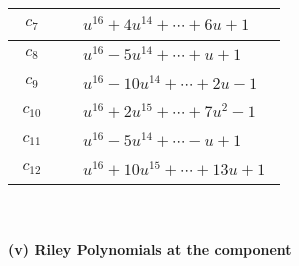 \documentclass[1p]{elsarticle_modified}
\theoremstyle{definition}
\begin{document}
\begin{tabular}{m{50pt}|m{274pt}}
\hline $$\begin{aligned}c_{7}\end{aligned}$$&$\begin{aligned}
&u^{16}+4 u^{14}+\cdots+6 u+1
\end{aligned}$\\
\hline $$\begin{aligned}c_{8}\end{aligned}$$&$\begin{aligned}
&u^{16}-5 u^{14}+\cdots+u+1
\end{aligned}$\\
\hline $$\begin{aligned}c_{9}\end{aligned}$$&$\begin{aligned}
&u^{16}-10 u^{14}+\cdots+2 u-1
\end{aligned}$\\
\hline $$\begin{aligned}c_{10}\end{aligned}$$&$\begin{aligned}
&u^{16}+2 u^{15}+\cdots+7 u^2-1
\end{aligned}$\\
\hline $$\begin{aligned}c_{11}\end{aligned}$$&$\begin{aligned}
&u^{16}-5 u^{14}+\cdots- u+1
\end{aligned}$\\
\hline $$\begin{aligned}c_{12}\end{aligned}$$&$\begin{aligned}
&u^{16}+10 u^{15}+\cdots+13 u+1
\end{aligned}$\\
\hline
\end{tabular}\\~\\
\newpage\renewcommand{\arraystretch}{1}
\flushleft \textbf{(v) Riley Polynomials at the component}\newline \\
\end{document}
